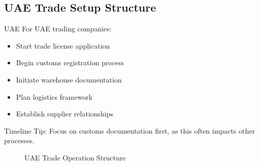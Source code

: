 \subsection{UAE Trade Setup Structure}\label{subsec:uae-setup}
\begin{regionalbox}{UAE}
For UAE trading companies:
\begin{itemize}
    \item Start trade license application
    \item Begin customs registration process
    \item Initiate warehouse documentation
    \item Plan logistics framework
    \item Establish supplier relationships
\end{itemize}

Timeline Tip: Focus on customs documentation first, as this often impacts other processes.

\begin{figure}[htbp]
    \centering
    \caption{UAE Trade Operation Structure}
    \label{fig:uae-trade-structure}
\end{figure}
\end{regionalbox}

